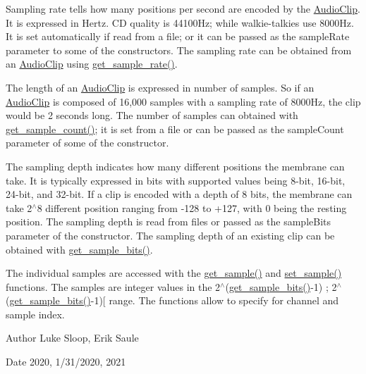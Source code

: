 Sampling rate tells how many positions per second are encoded by the \hyperlink{classbridges_1_1audio__clip_1_1_audio_clip}{Audio\+Clip}. It is expressed in Hertz. CD quality is 44100\+Hz; while walkie-\/talkies use 8000\+Hz. It is set automatically if read from a file; or it can be passed as the sample\+Rate parameter to some of the constructors. The sampling rate can be obtained from an \hyperlink{classbridges_1_1audio__clip_1_1_audio_clip}{Audio\+Clip} using \hyperlink{classbridges_1_1audio__clip_1_1_audio_clip_a6e9cad3d81f39b3fe811307f024fa713}{get\+\_\+sample\+\_\+rate()}.

The length of an \hyperlink{classbridges_1_1audio__clip_1_1_audio_clip}{Audio\+Clip} is expressed in number of samples. So if an \hyperlink{classbridges_1_1audio__clip_1_1_audio_clip}{Audio\+Clip} is composed of 16,000 samples with a sampling rate of 8000\+Hz, the clip would be 2 seconds long. The number of samples can obtained with \hyperlink{classbridges_1_1audio__clip_1_1_audio_clip_ace0227160e6743e8fd19c803af81d474}{get\+\_\+sample\+\_\+count()}; it is set from a file or can be passed as the sample\+Count parameter of some of the constructor.

The sampling depth indicates how many different positions the membrane can take. It is typically expressed in bits with supported values being 8-\/bit, 16-\/bit, 24-\/bit, and 32-\/bit. If a clip is encoded with a depth of 8 bits, the membrane can take 2$^\wedge$8 different position ranging from -\/128 to +127, with 0 being the resting position. The sampling depth is read from files or passed as the sample\+Bits parameter of the constructor. The sampling depth of an existing clip can be obtained with \hyperlink{classbridges_1_1audio__clip_1_1_audio_clip_a8dc41d20f5c06e83f7aea326072ef32e}{get\+\_\+sample\+\_\+bits()}.

The individual samples are accessed with the \hyperlink{classbridges_1_1audio__clip_1_1_audio_clip_a6ebead4b2cbd7c5d39c3d67775013ac4}{get\+\_\+sample()} and \hyperlink{classbridges_1_1audio__clip_1_1_audio_clip_af9b9e0b615ada4a6802121f59af3da89}{set\+\_\+sample()} functions. The samples are integer values in the 2$^\wedge$(\hyperlink{classbridges_1_1audio__clip_1_1_audio_clip_a8dc41d20f5c06e83f7aea326072ef32e}{get\+\_\+sample\+\_\+bits()}-\/1) ; 2$^\wedge$(\hyperlink{classbridges_1_1audio__clip_1_1_audio_clip_a8dc41d20f5c06e83f7aea326072ef32e}{get\+\_\+sample\+\_\+bits()}-\/1)\mbox{[} range. The functions allow to specify for channel and sample index.

\begin{DoxyAuthor}{Author}
Luke Sloop, Erik Saule
\end{DoxyAuthor}
\begin{DoxyDate}{Date}
2020, 1/31/2020, 2021 
\end{DoxyDate}
